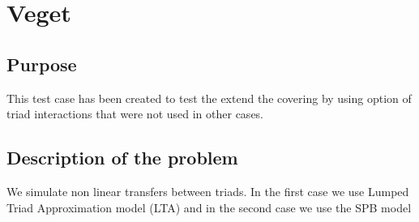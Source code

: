 \section{Veget}
%
%
\subsection{Purpose}
%
This test case has been created to test the extend the covering by using option of triad interactions that were not used in other cases. 

%
\subsection{Description of the problem}
We simulate non linear transfers between triads. In the first case we use Lumped Triad Approximation model (LTA) and in the second case we use the SPB model 
